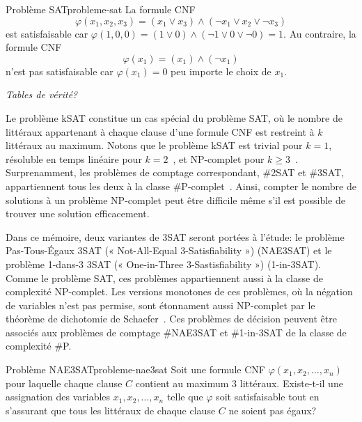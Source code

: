 \begin{example}{Problème SAT}{probleme-sat}
    La formule CNF
    \begin{equation*}
        \varphi(x_{1}, x_{2}, x_{3}) = (x_{1} \lor x_{3}) \land (\neg x_{1} \lor x_{2} \lor \neg x_{3}) 
    \end{equation*}
    est satisfaisable car $\varphi(1,0,0) = (1 \lor 0) \land (\neg 1 \lor 0 \lor \neg 0) = 1$. Au contraire, la formule CNF
    \begin{equation*}
        \varphi(x_{1})= (x_{1}) \land (\neg x_{1})
    \end{equation*}
    n'est pas satisfaisable car $\varphi (x_{1}) = 0$ peu importe le choix de $x_{1}$.
\end{example}

\textcolor{mydarkred}{\textit{Tables de vérité?}}

Le problème kSAT constitue un cas spécial du problème SAT, où le nombre de littéraux appartenant à chaque clause d'une formule CNF est restreint à $k$ littéraux au maximum. Notons que le problème kSAT est trivial pour $k=1$, résoluble en temps linéaire pour $k=2$~\cite{kromDecisionProblemClass1967}, et \textsf{NP}-complet pour $k \geq 3$~\cite{karpReducibilityCombinatorialProblems1972}. Surprenamment, les problèmes de comptage correspondant, \#2SAT et \#3SAT, appartiennent tous les deux à la classe \textsf{\#P}-complet~\cite{valiantComplexityEnumerationReliability1979}. Ainsi, compter le nombre de solutions à un problème \textsf{NP}-complet peut être difficile même s'il est possible de trouver une solution efficacement.

Dans ce mémoire, deux variantes de 3SAT seront portées à l'étude: le problème Pas-Tous-Égaux 3SAT (« Not-All-Equal 3-Satisfiability ») (NAE3SAT) et le problème 1-dans-3 3SAT (« One-in-Three 3-Sastisfiability ») (1-in-3SAT). 
Comme le problème SAT, ces problèmes appartiennent aussi à la classe de complexité \textsf{NP}-complet. Les versions monotones de ces problèmes, où la négation de variables n'est pas permise, sont étonnament aussi \textsf{NP}-complet par le théorème de dichotomie de Schaefer~\cite{schaeferComplexitySatisfiabilityProblems1978}. Ces problèmes de décision peuvent être associés aux problèmes de comptage \#NAE3SAT et \#1-in-3SAT de la classe de complexité \textsf{\#P}.

\begin{maindefinition}{Problème NAE3SAT}{probleme-nae3sat}
    Soit une formule CNF $\varphi(x_{1}, x_{2}, \dots, x_{n})$ pour laquelle chaque clause $C$ contient au maximum 3 littéraux. Existe-t-il une assignation des variables $x_{1}, x_{2}, \dots, x_{n}$ telle que $\varphi$ soit satisfaisable tout en s'assurant que tous les littéraux de chaque clause $C$ ne soient pas égaux?
\end{maindefinition}

